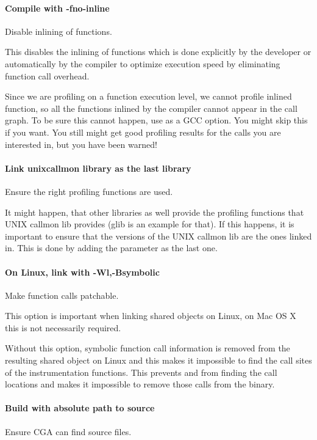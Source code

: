 \paragraph{Compile with -fno-inline} Disable inlining of functions.

This disables the inlining of functions which is done explicitly by the developer or automatically by the compiler to optimize execution speed by eliminating function call overhead.

Since we are profiling on a function execution level, we cannot profile inlined function, so all the functions inlined by the compiler cannot appear in the call graph. To be sure this cannot happen, use  as a GCC option. You might skip this if you want. You still might get good profiling results for the calls you are interested in, but you have been warned!

\paragraph{Link unixcallmon library as the last library} Ensure the right profiling functions are used.

It might happen, that other libraries as well provide the profiling functions that UNIX callmon lib provides (glib is an example for that). If this happens, it is important to ensure that the versions of the UNIX callmon lib are the ones linked in. This is done by adding the  parameter as the last one.

\paragraph{On Linux, link with -Wl,-Bsymbolic} Make function calls patchable.

This option is important when linking shared objects on Linux, on Mac OS X this is not necessarily required.

Without this option, symbolic function call information is removed from the resulting shared object on Linux and this makes it impossible to find the call sites of the instrumentation functions.  This prevents  and  from finding the call locations and makes it impossible to remove those calls from the binary.

\paragraph{Build with absolute path to source} Ensure CGA can find source files.


